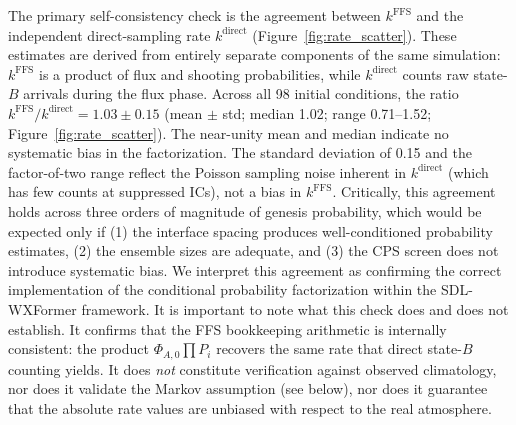 \documentclass[11pt]{article}
\begin{document}
The primary self-consistency check is the agreement between $k^{\text{FFS}}$ and the
independent direct-sampling rate $k^{\text{direct}}$ (Figure~\ref{fig:rate_scatter}).
These estimates are derived from entirely separate components of the same simulation:
$k^{\text{FFS}}$ is a product of flux and shooting probabilities, while $k^{\text{direct}}$
counts raw state-$B$ arrivals during the flux phase.
Across all 98 initial conditions, the ratio $k^{\text{FFS}}/k^{\text{direct}} = 1.03 \pm 0.15$
(mean $\pm$ std; median 1.02; range 0.71--1.52; Figure~\ref{fig:rate_scatter}).
The near-unity mean and median indicate no systematic bias in the factorization.
The standard deviation of 0.15 and the factor-of-two range reflect the Poisson
sampling noise inherent in $k^{\text{direct}}$ (which has few counts at suppressed ICs),
not a bias in $k^{\text{FFS}}$.
Critically, this agreement holds across three orders of magnitude of genesis probability,
which would be expected only if (1) the interface spacing produces well-conditioned
probability estimates, (2) the ensemble sizes are adequate, and (3) the CPS screen
does not introduce systematic bias.
We interpret this agreement as confirming the correct implementation of the conditional
probability factorization within the SDL-WXFormer framework.
It is important to note what this check does and does not establish.
It confirms that the FFS bookkeeping arithmetic is internally consistent: the product
$\Phi_{A,0}\prod P_i$ recovers the same rate that direct state-$B$ counting yields.
It does \emph{not} constitute verification against observed climatology, nor does it
validate the Markov assumption (see below), nor does it guarantee that the absolute
rate values are unbiased with respect to the real atmosphere.
\end{document}
